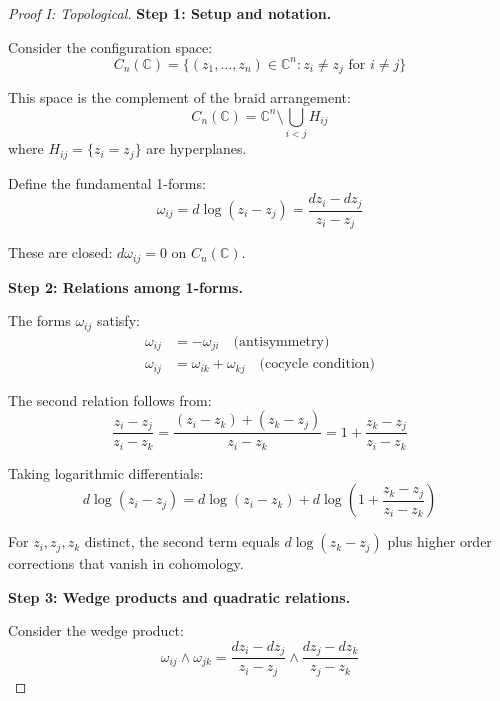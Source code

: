 \begin{proof}[Proof I: Topological]

\textbf{Step 1: Setup and notation.}

Consider the configuration space:
\begin{equation}
C_n(\mathbb{C}) = \{(z_1, \ldots, z_n) \in \mathbb{C}^n : z_i \neq z_j \text{ for } 
i \neq j\}
\end{equation}

This space is the complement of the braid arrangement:
\begin{equation}
C_n(\mathbb{C}) = \mathbb{C}^n \setminus \bigcup_{i<j} H_{ij}
\end{equation}
where $H_{ij} = \{z_i = z_j\}$ are hyperplanes.

Define the fundamental 1-forms:
\begin{equation}
\omega_{ij} = d\log(z_i - z_j) = \frac{dz_i - dz_j}{z_i - z_j}
\end{equation}

These are closed: $d\omega_{ij} = 0$ on $C_n(\mathbb{C})$.

\textbf{Step 2: Relations among 1-forms.}

The forms $\omega_{ij}$ satisfy:
\begin{align}
\omega_{ij} &= -\omega_{ji} \quad \text{(antisymmetry)}\\
\omega_{ij} &= \omega_{ik} + \omega_{kj} \quad \text{(cocycle condition)}
\end{align}

The second relation follows from:
\begin{equation}
\frac{z_i - z_j}{z_i - z_k} = \frac{(z_i - z_k) + (z_k - z_j)}{z_i - z_k} = 1 + 
\frac{z_k - z_j}{z_i - z_k}
\end{equation}

Taking logarithmic differentials:
\begin{equation}
d\log(z_i - z_j) = d\log(z_i - z_k) + d\log\left(1 + \frac{z_k - z_j}{z_i - z_k}\right)
\end{equation}

For $z_i, z_j, z_k$ distinct, the second term equals $d\log(z_k - z_j)$ plus higher 
order corrections that vanish in cohomology.

\textbf{Step 3: Wedge products and quadratic relations.}

Consider the wedge product:
\begin{equation}
\omega_{ij} \wedge \omega_{jk} = \frac{dz_i - dz_j}{z_i - z_j} \wedge \frac{dz_j - 
dz_k}{z_j - z_k}
\end{equation}


\end{proof}
